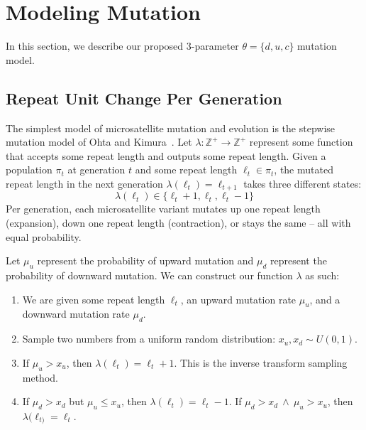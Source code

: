 \section{Modeling Mutation}\label{sec:mm}
In this section, we describe our proposed 3-parameter $\theta = \{ d, u, c\}$ mutation model.

\subsection{Repeat Unit Change Per Generation}\label{subsec:rucpg}
The simplest model of microsatellite mutation and evolution is the stepwise mutation
model of Ohta and Kimura~\cite{ohtaModelMutationAppropriate2007}.
Let $\lambda : \mathbb{Z}^+ \rightarrow \mathbb{Z}^+$ represent some function that accepts some repeat length and outputs some
repeat length.
Given a population $\pi_t$ at generation $t$ and some repeat length $\ell_t \in \pi_t$, the mutated repeat length
in the next generation $\lambda(\ell_{t}) = \ell_{t+1}$ takes three different states:
\begin{equation}
    \lambda(\ell_t) \in \{ \ell_t + 1 , \ell_t, \ell_t - 1\}
\end{equation}
Per generation, each microsatellite variant mutates up one repeat length (expansion), down one repeat length
(contraction), or stays the same -- all with equal probability.

Let $\mu_u$ represent the probability of upward mutation and $\mu_d$ represent the probability of downward mutation.
We can construct our function $\lambda$ as such:
\begin{enumerate}
    \item We are given some repeat length $\ell_t$, an upward mutation rate $\mu_u$, and a
        downward mutation rate $\mu_d$.
    \item Sample two numbers from a uniform random distribution: $x_u, x_d \sim U(0, 1)$.
    \item If $\mu_u > x_u$, then $\lambda(\ell_{t}) = \ell_t + 1$.
        This is the inverse transform sampling method. \label{enum:um}
    \item If $\mu_d > x_d$ but $\mu_u \leq x_u$, then $\lambda(\ell_{t}) = \ell_t - 1$. \label{enum:dm}
        If $\mu_d > x_d \ \land \ \mu_u > x_u$, then $\lambda(\ell_{t)} = \ell_{t}$.
\end{enumerate}

